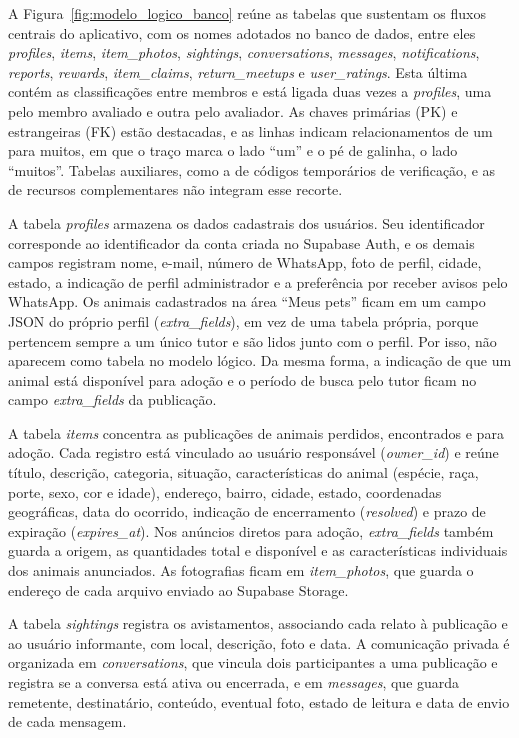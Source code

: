 A Figura~\ref{fig:modelo_logico_banco} reúne as tabelas que sustentam os fluxos centrais do aplicativo, com os nomes adotados no banco de dados, entre eles \textit{profiles}, \textit{items}, \textit{item\_photos}, \textit{sightings}, \textit{conversations}, \textit{messages}, \textit{notifications}, \textit{reports}, \textit{rewards}, \textit{item\_claims}, \textit{return\_meetups} e \textit{user\_ratings}. Esta última contém as classificações entre membros e está ligada duas vezes a \textit{profiles}, uma pelo membro avaliado e outra pelo avaliador. As chaves primárias (PK) e estrangeiras (FK) estão destacadas, e as linhas indicam relacionamentos de um para muitos, em que o traço marca o lado ``um'' e o pé de galinha, o lado ``muitos''. Tabelas auxiliares, como a de códigos temporários de verificação, e as de recursos complementares não integram esse recorte.

A tabela \textit{profiles} armazena os dados cadastrais dos usuários. Seu identificador corresponde ao identificador da conta criada no Supabase Auth, e os demais campos registram nome, e-mail, número de WhatsApp, foto de perfil, cidade, estado, a indicação de perfil administrador e a preferência por receber avisos pelo WhatsApp. Os animais cadastrados na área ``Meus pets'' ficam em um campo JSON do próprio perfil (\textit{extra\_fields}), em vez de uma tabela própria, porque pertencem sempre a um único tutor e são lidos junto com o perfil. Por isso, não aparecem como tabela no modelo lógico. Da mesma forma, a indicação de que um animal está disponível para adoção e o período de busca pelo tutor ficam no campo \textit{extra\_fields} da publicação.

A tabela \textit{items} concentra as publicações de animais perdidos, encontrados e para adoção. Cada registro está vinculado ao usuário responsável (\textit{owner\_id}) e reúne título, descrição, categoria, situação, características do animal (espécie, raça, porte, sexo, cor e idade), endereço, bairro, cidade, estado, coordenadas geográficas, data do ocorrido, indicação de encerramento (\textit{resolved}) e prazo de expiração (\textit{expires\_at}). Nos anúncios diretos para adoção, \textit{extra\_fields} também guarda a origem, as quantidades total e disponível e as características individuais dos animais anunciados. As fotografias ficam em \textit{item\_photos}, que guarda o endereço de cada arquivo enviado ao Supabase Storage.

A tabela \textit{sightings} registra os avistamentos, associando cada relato à publicação e ao usuário informante, com local, descrição, foto e data. A comunicação privada é organizada em \textit{conversations}, que vincula dois participantes a uma publicação e registra se a conversa está ativa ou encerrada, e em \textit{messages}, que guarda remetente, destinatário, conteúdo, eventual foto, estado de leitura e data de envio de cada mensagem.

